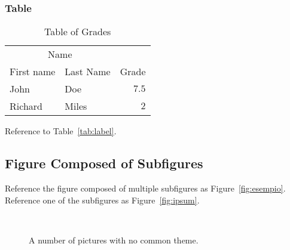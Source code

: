 \documentclass[
11pt, %
a4paper, %
oneside, %
headinclude,footinclude, %
BCOR5mm, %
]{scrartcl}
\begin{document}
\subsubsection{Table}

\lipsum[13] %

\begin{table}[hbt]
\caption{Table of Grades}
\centering
\begin{tabular}{llr}
\toprule
\multicolumn{2}{c}{Name} \\
\cmidrule(r){1-2}
First name & Last Name & Grade \\
\midrule
John & Doe & $7.5$ \\
Richard & Miles & $2$ \\
\bottomrule
\end{tabular}
\label{tab:label}
\end{table}

Reference to Table~\vref{tab:label}. %


\subsection{Figure Composed of Subfigures}

Reference the figure composed of multiple subfigures as Figure~\vref{fig:esempio}. Reference one of the subfigures as Figure~\vref{fig:ipsum}. %

\lipsum[15-18] %

\begin{figure}[tb]
\centering
{} \quad
{} \\
 \quad
{}
\caption[A number of pictures.]{A number of pictures with no common theme.} %
\label{fig:esempio}
\end{figure}


\renewcommand{\refname}{\spacedlowsmallcaps{References}} %




\end{document}
